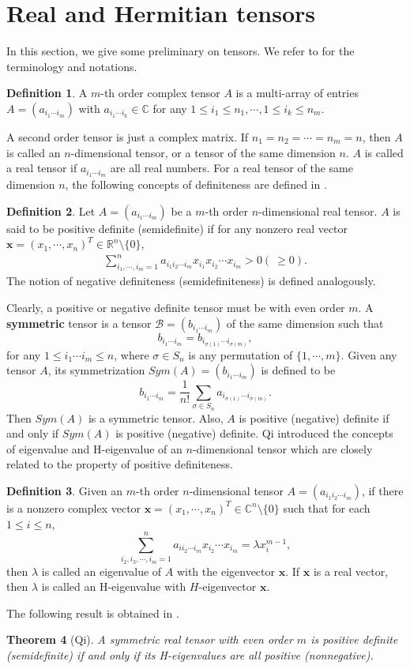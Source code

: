 \documentclass[10pt,reqno]{amsart}
\newtheorem{thm}{Theorem}[section]
\theoremstyle{definition}
\newtheorem{defn}[thm]{Definition}
\begin{document}
\section{Real and Hermitian tensors}
In this section, we give some preliminary on tensors. We refer to \cite{QL} for the terminology and notations.
\begin{defn} A $m$-th order complex tensor $A$ is a multi-array of entries $A=(a_{i_1\cdots i_m})$ with $a_{i_1\cdots i_k}\in \mathbb C$ for any $1\leq i_1\leq n_1, \cdots, 1\leq i_k\leq n_m$. 
	\end{defn}
A second order tensor is just a complex matrix. If $n_1=n_2=\cdots=n_m=n$, then $A$ is called an $n$-dimensional tensor, or a tensor of the same dimension $n$. $A$ is called a real tensor if $a_{i_1\cdots i_m}$ are all real numbers. For a real tensor of the same dimension $n$, the following concepts of definiteness are defined in \cite{QL}.
\begin{defn} \label{real}
Let $A=(a_{i_1\cdots i_m})$ be a $m$-th order $n$-dimensional real tensor. $A$ is said to be positive definite (semidefinite) if for any nonzero real vector $\mathbf{x}=(x_1,\cdots, x_n)^T\in \mathbb R^n\setminus \{0\}$, 
\begin{align}
\sum_{i_1,\cdots, i_m=1}^n a_{i_1i_2\cdots i_m} x_{i_1}x_{i_2}\cdots x_{i_m}>0 (\ \geq 0).\label{psd} \end{align}
The notion of negative definiteness (semidefiniteness) is defined analogously. 
\end{defn}
Clearly, a positive or negative definite tensor must be with even order $m$.  A \textbf{symmetric} tensor is a tensor $\mathcal B=(b_{i_1\cdots i_m})$ of the same dimension such that $$b_{i_1\cdots i_m}=b_{i_{\sigma(1)}\cdots i_{\sigma(m)}},$$ for any $1\leq i_1\cdots i_m\leq n$, where $\sigma\in S_n$ is any permutation of $\{1,\cdots, m\}$. Given any tensor $A$, its symmetrization $Sym(A)=(b_{i_1\cdots i_m})$ is defined to be 
$$b_{i_1\cdots i_m}=\dfrac{1}{n!}\sum_{\sigma\in S_n} a_{i_{\sigma(1)}\cdots i_{\sigma(m)}}.$$ Then $Sym(A)$ is a symmetric tensor. Also, $A$ is positive (negative) definite if and only if 
$Sym(A)$ is positive (negative) definite. Qi \cite{Q1} introduced the concepts of eigenvalue and H-eigenvalue of an $n$-dimensional tensor which are closely related to the property of positive definiteness. 
\begin{defn}  Given an $m$-th order $n$-dimensional tensor $A=(a_{i_1i_2\cdots i_m})$, if there is a nonzero complex vector $\mathbf{x}=(x_1,\cdots, x_n)^T\in \mathbb C^n\setminus \{0\}$ such that for each $1\leq i\leq n$, $$\sum_{i_2,i_3,\cdots, i_m=1}^n a_{ii_2\cdots i_m} x_{i_2}\cdots x_{i_m}=\lambda x_i^{m-1},$$ then $\lambda$ is called an eigenvalue of $A$ with the eigenvector $\mathbf{x}$. If $\mathbf{x}$ is a real vector, then $\lambda$ is called an H-eigenvalue with $H$-eigenvector $\mathbf{x}$. 
\end{defn}
The following result is obtained in \cite{Q1}. 
\begin{thm}[Qi] A symmetric real tensor with even order $m$ is positive definite (semidefinite) if and only if its H-eigenvalues are all positive (nonnegative). 
\end{thm}
\end{document}
